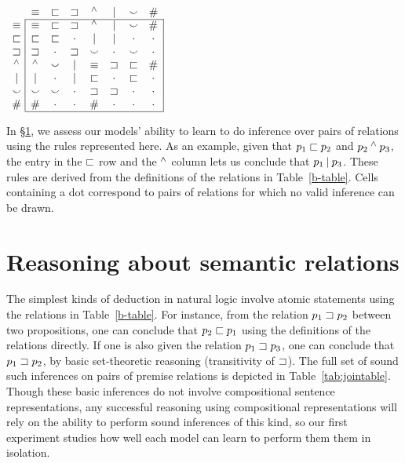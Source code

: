 
\begin{table}[tp]
  \centering  \small
  \setlength{\arraycolsep}{8pt}
  \renewcommand{\arraystretch}{1.1}
  \newcommand{\UNK}{\cdot}  
  $\begin{array}[t]{c@{ \ }|*{7}{c}|}
    \multicolumn{1}{c}{}
             & \nateq     & \natfor     & \natrev     & \natneg    & \natalt     & \natcov     & \multicolumn{1}{c}{\natind} \\
    \cline{2-8}
    \nateq  & \nateq &   \natfor &  \natrev &  \natneg &   \natalt &  \natcov &  \natind \\
    \natfor & \natfor &  \natfor &  \UNK &  \natalt &   \natalt &  \UNK &  \UNK \\
    \natrev & \natrev &  \UNK &  \natrev &  \natcov &   \UNK &  \natcov &  \UNK \\
    \natneg & \natneg &  \natcov &  \natalt &  \nateq &    \natrev &  \natfor &  \natind \\
    \natalt & \natalt &  \UNK &  \natalt &  \natfor &   \UNK &  \natfor &  \UNK \\
    \natcov & \natcov &  \natcov &  \UNK &  \natrev &   \natrev &  \UNK &  \UNK \\
    \natind & \natind & \UNK &  \UNK &  \natind &  \UNK &  \UNK &  \UNK \\
    \cline{2-8}
  \end{array}$
  \caption{In \S\ref{sec:join}, we assess our models' ability to learn to do inference over pairs of relations using the rules represented here. As an example, given that $p_1 \sqsubset p_2$ and $p_2 \mathbin{^{\wedge}} p_3$, the entry in the $\sqsubset$ row and the $\mathbin{^{\wedge}}$ column lets us conclude that $p_1 \mathbin{|} p_3$.
These rules are derived from the definitions of the relations in Table~\ref{b-table}.  Cells containing a dot correspond to pairs
of relations for which no valid inference can be drawn.} 
  \label{tab:jointable}
\end{table}

\section{Reasoning about semantic relations}\label{sec:join}

The simplest kinds of deduction in natural logic involve atomic statements 
using the relations in Table~\ref{b-table}. 
For instance, from the relation $p_1 \sqsupset p_2$ between two propositions, 
one can conclude that $p_2 \sqsubset p_1$ using the definitions of the relations directly. 
If one is also given the relation $p_1 \sqsupset p_3$, one can conclude that $p_1 \sqsupset p_2$, by basic set-theoretic reasoning (transitivity of $\sqsupset$). The
full set of sound such inferences on pairs of premise relations is depicted in
Table~\ref{tab:jointable}. Though these basic inferences do not involve compositional
sentence representations, any successful reasoning using compositional representations
will rely on the ability to perform sound inferences of this kind, so our first experiment studies how well each model can learn to perform them them in isolation.


